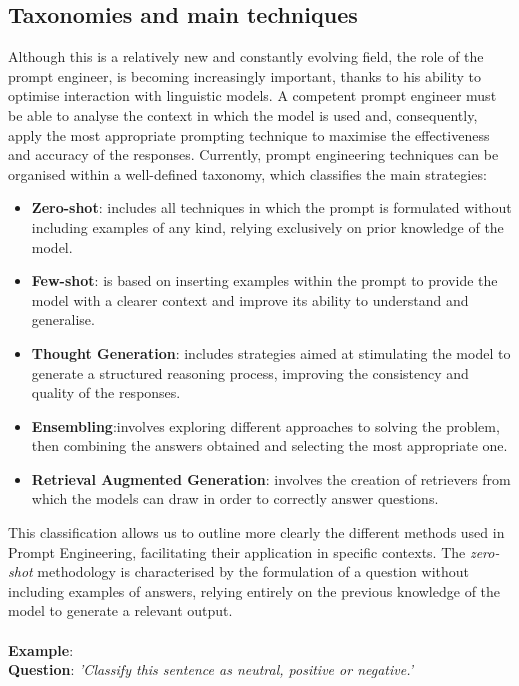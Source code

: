 \subsection{Taxonomies and main techniques}
\label{sec: taxonomies}
Although this is a relatively new and constantly evolving field, the role of the prompt engineer, is becoming increasingly important, thanks to his ability to optimise interaction with linguistic models. A competent prompt engineer must be able to analyse the context in which the model is used and, consequently, apply the most appropriate prompting technique to maximise the effectiveness and accuracy of the responses.
Currently, prompt engineering techniques can be organised within a well-defined taxonomy, which classifies the main strategies:\\
\begin{itemize}
    \item \textbf{Zero-shot}: includes all techniques in which the prompt is formulated without including examples of any kind, relying exclusively on prior knowledge of the model.
    \item \textbf{Few-shot}: is based on inserting examples within the prompt to provide the model with a clearer context and improve its ability to understand and generalise.
    \item \textbf{Thought Generation}: includes strategies aimed at stimulating the model to generate a structured reasoning process, improving the consistency and quality of the responses.
    \item  \textbf{Ensembling}:involves exploring different approaches to solving the problem, then combining the answers obtained and selecting the most appropriate one.
    \item \textbf{Retrieval Augmented Generation}: involves the creation of retrievers \cite{Rag} from which the models can draw in order to correctly answer questions.

\end{itemize}
This classification allows us to outline more clearly the different methods used in Prompt Engineering, facilitating their application in specific contexts.
The \textit{zero-shot} methodology is characterised by the formulation of a question without including examples of answers, relying entirely on the previous knowledge of the model to generate a relevant output.\\
\\
\textbf{Example}:\\
\textbf{Question}: \textit{'Classify this sentence as neutral, positive or negative.'}\\
